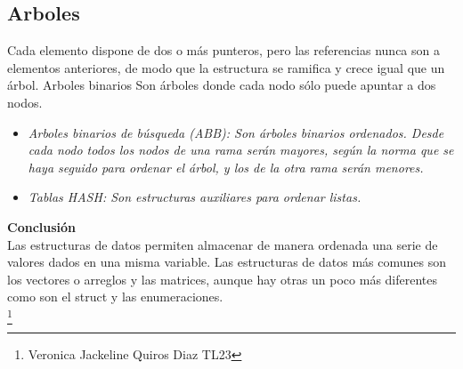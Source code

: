\documentclass{article}
\begin{document}
\subsection{Arboles}\label{sec:Arboles}
 Cada elemento dispone de dos o más punteros, pero las referencias nunca son a elementos anteriores, de modo que la estructura se ramifica y crece igual que un árbol.
Arboles binarios Son árboles donde cada nodo sólo puede apuntar a dos nodos.
\begin{itemize}
 \item \textsl{Arboles binarios de búsqueda (ABB): Son árboles binarios ordenados. Desde cada nodo todos los nodos de una rama serán mayores, según la norma que se haya seguido para ordenar el árbol, y los de la otra rama serán menores.}
 \item \textsl{Tablas HASH: Son estructuras auxiliares para ordenar listas.\\}
\end{itemize}
\textbf{\Large Conclusi\'on}\label{sec:Conclusion}
\\Las estructuras de datos permiten almacenar de manera ordenada una serie de valores dados en una misma variable. Las estructuras de datos más comunes son los vectores o arreglos y las matrices, aunque hay otras un poco más diferentes como son el struct y las enumeraciones.
\\
\footnote{Veronica Jackeline Quiros Diaz TL23}
\end{document}
